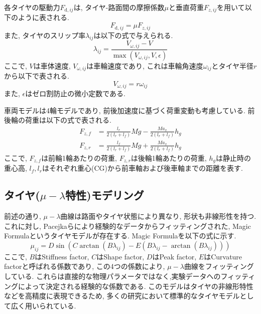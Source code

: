 \documentclass[11pt,a4paper,oneside,onecolumn,fleqn,dvipdfmx]{jsarticle}
\begin{document}
各タイヤの駆動力$F_{\mathrm{d},ij}$は, タイヤ-路面間の摩擦係数$\mu$と垂直荷重$F_{z,ij}$を用いて以下のように表される.
\begin{equation}
\label{eq:1_Fd}
F_{\mathrm{d},ij} = \mu F_{z,ij}
\end{equation}
また, タイヤのスリップ率$\lambda_{ij}$は以下の式で与えられる.
\begin{equation}
\label{eq:1_lambda}
\lambda_{ij} = \frac{V_{\omega,ij} - V}{\max{(V_{\omega,ij}, V, \epsilon)}}
\end{equation}
ここで, $V$は車体速度, $V_{\omega,ij}$は車輪速度であり, これは車輪角速度$\omega_{ij}$とタイヤ半径$r$から以下で表される.
\begin{equation}
\label{eq:1_V_omega}
V_{\omega,ij} = r \omega_{ij}
\end{equation}
また, $\epsilon$はゼロ割防止の微小定数である.

車両モデルは4輪モデルであり, 前後加速度に基づく荷重変動も考慮している. 前後輪の荷重は以下の式で表される.
\begin{equation}
    \label{eq:2_load_trans}
    \begin{aligned}
        F_{z,f}
        &=
        \frac{l_r}{2(l_r+l_f)}Mg
        -
        \frac{Ma_x}{2(l_r+l_f)}h_g \\
        F_{z,r}
        &=
        \frac{l_f}{2(l_r+l_f)}Mg
        +
        \frac{Ma_x}{2(l_r+l_f)}h_g
    \end{aligned}
\end{equation}
ここで, $F_{z,f}$は前輪1輪あたりの荷重, $F_{z,r}$は後輪1輪あたりの荷重, $h_g$は静止時の重心高, $l_f, l_r$はそれぞれ重心(CG)から前車軸および後車軸までの距離を表す. 
\subsection{タイヤ($\mu-\lambda$特性)モデリング}
前述の通り, $\mu-\lambda$曲線は路面やタイヤ状態により異なり, 形状も非線形性を持つ.
これに対し, Pacejkaらにより経験的なデータからフィッティングされた, Magic Formula\cite{pacejka}というタイヤモデルが存在する. 
Magic Formulaを以下の式に示す. 
\begin{equation}
    \label{eq:2_magicformula}
    \mu_{ij}
    =
    D\sin\left(
    C\arctan(B\lambda_{ij})
    -
    E\left(
    B\lambda_{ij}
    -
    \arctan(B\lambda_{ij})
    \right)
    \right)
    \end{equation}
ここで, $B$はStiffness factor, $C$はShape factor, $D$はPeak factor, $E$はCurvature factorと呼ばれる係数であり, この4つの係数により, $\mu-\lambda$曲線をフィッティングしている. 
これらは直接的な物理パラメータではなく,実験データへのフィッティングによって決定される経験的な係数である.
このモデルはタイヤの非線形特性などを高精度に表現できるため, 多くの研究において標準的なタイヤモデルとして広く用いられている.
\end{document}
